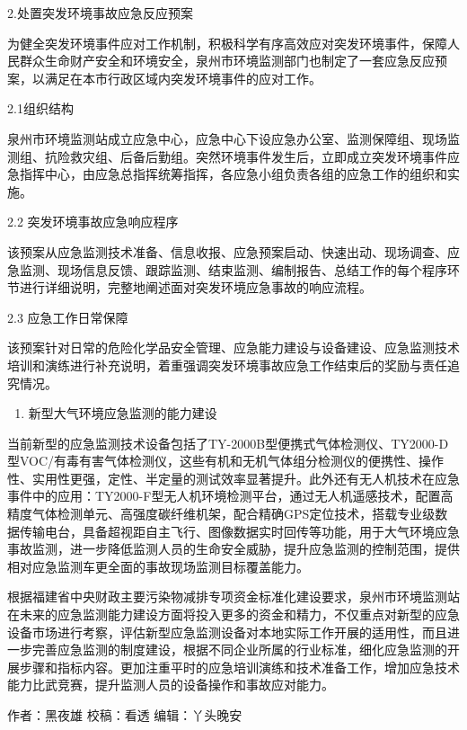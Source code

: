 \documentclass[
]{book}
\providecommand{\tightlist}{%
  \setlength{\itemsep}{0pt}\setlength{\parskip}{0pt}}
\begin{document}
2.处置突发环境事故应急反应预案

为健全突发环境事件应对工作机制，积极科学有序高效应对突发环境事件，保障人民群众生命财产安全和环境安全，泉州市环境监测部门也制定了一套应急反应预案，以满足在本市行政区域内突发环境事件的应对工作。

2.1组织结构

泉州市环境监测站成立应急中心，应急中心下设应急办公室、监测保障组、现场监测组、抗险救灾组、后备后勤组。突然环境事件发生后，立即成立突发环境事件应急指挥中心，由应急总指挥统筹指挥，各应急小组负责各组的应急工作的组织和实施。

2.2 突发环境事故应急响应程序

该预案从应急监测技术准备、信息收报、应急预案启动、快速出动、现场调查、应急监测、现场信息反馈、跟踪监测、结束监测、编制报告、总结工作的每个程序环节进行详细说明，完整地阐述面对突发环境应急事故的响应流程。

2.3 应急工作日常保障

该预案针对日常的危险化学品安全管理、应急能力建设与设备建设、应急监测技术培训和演练进行补充说明，着重强调突发环境事故应急工作结束后的奖励与责任追究情况。

\begin{enumerate}
\def\labelenumi{\arabic{enumi}.}
\setcounter{enumi}{2}
\tightlist
\item
  新型大气环境应急监测的能力建设
\end{enumerate}

当前新型的应急监测技术设备包括了TY-2000B型便携式气体检测仪、TY2000-D型VOC/有毒有害气体检测仪，这些有机和无机气体组分检测仪的便携性、操作性、实用性更强，定性、半定量的测试效率显著提升。此外还有无人机技术在应急事件中的应用：TY2000-F型无人机环境检测平台，通过无人机遥感技术，配置高精度气体检测单元、高强度碳纤维机架，配合精确GPS定位技术，搭载专业级数据传输电台，具备超视距自主飞行、图像数据实时回传等功能，用于大气环境应急事故监测，进一步降低监测人员的生命安全威胁，提升应急监测的控制范围，提供相对应急监测车更全面的事故现场监测目标覆盖能力。

根据福建省中央财政主要污染物减排专项资金标准化建设要求，泉州市环境监测站在未来的应急监测能力建设方面将投入更多的资金和精力，不仅重点对新型的应急设备市场进行考察，评估新型应急监测设备对本地实际工作开展的适用性，而且进一步完善应急监测的制度建设，根据不同企业所属的行业标准，细化应急监测的开展步骤和指标内容。更加注重平时的应急培训演练和技术准备工作，增加应急技术能力比武竞赛，提升监测人员的设备操作和事故应对能力。

作者：黑夜雄
校稿：看透
编辑：丫头晚安
\end{document}
